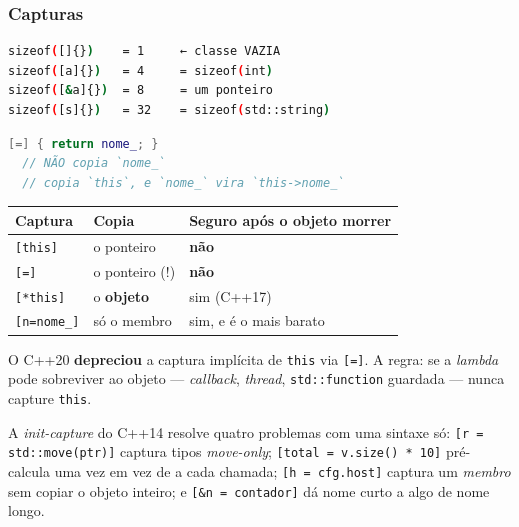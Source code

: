 \subsubsection{Capturas}

\begin{lstlisting}[style=bt, language=bash,
    caption={Saída de \texttt{src/lambdas/}: o tamanho da classe gerada é a soma
             das capturas.}]
sizeof([]{})    = 1     ← classe VAZIA
sizeof([a]{})   = 4     = sizeof(int)
sizeof([&a]{})  = 8     = um ponteiro
sizeof([s]{})   = 32    = sizeof(std::string)
\end{lstlisting}

\begin{armadilha}
\begin{lstlisting}[style=bt, language=C++, frame=none,
                   xleftmargin=0pt, xrightmargin=0pt]
[=] { return nome_; }
  // NÃO copia `nome_`
  // copia `this`, e `nome_` vira `this->nome_`
\end{lstlisting}
\begin{center}\footnotesize
\begin{tabular}{@{}lll@{}}
\toprule
\textbf{Captura} & \textbf{Copia} & \textbf{Seguro após o objeto morrer} \\
\midrule
\texttt{[this]}     & o ponteiro     & \textbf{não} \\
\texttt{[=]}        & o ponteiro (!) & \textbf{não} \\
\texttt{[*this]}    & o \textbf{objeto} & sim (C++17) \\
\texttt{[n=nome\_]} & só o membro    & sim, e é o mais barato \\
\bottomrule
\end{tabular}
\end{center}
O C++20 \textbf{depreciou} a captura implícita de \texttt{this} via
\texttt{[=]}. A regra: se a \emph{lambda} pode sobreviver ao objeto ---
\emph{callback}, \emph{thread}, \texttt{std::function} guardada --- nunca
capture \texttt{this}.
\end{armadilha}

A \emph{init-capture} do C++14 resolve quatro problemas com uma sintaxe só:
\texttt{[r = std::move(ptr)]} captura tipos \emph{move-only};
\texttt{[total = v.size() * 10]} pré-calcula uma vez em vez de a cada chamada;
\texttt{[h = cfg.host]} captura um \emph{membro} sem copiar o objeto inteiro; e
\texttt{[\&n = contador]} dá nome curto a algo de nome longo.

